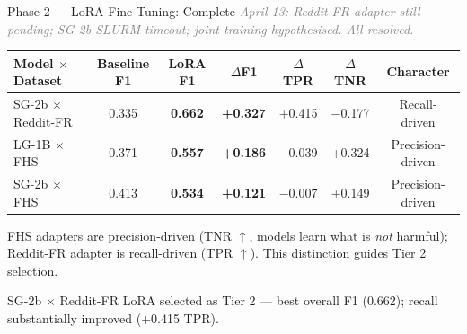 \documentclass[aspectratio=169, 12pt]{beamer}
\newcommand{\good}[1]{\textcolor{okgreen}{\textbf{#1}}}
\begin{document}
\begin{frame}[shrink=30]{Phase 2 --- LoRA Fine-Tuning: Complete}
  \textit{\small\textcolor{gray}{April 13: Reddit-FR adapter still pending; SG-2b SLURM timeout; joint training
  hypothesised. All resolved.}}\\[4pt]

  \scriptsize
  \begin{tabular}{lcccccc}
    \toprule
    \textbf{Model $\times$ Dataset} & \textbf{Baseline F1} & \textbf{LoRA F1} &
    \textbf{$\Delta$F1} & \textbf{$\Delta$TPR} & \textbf{$\Delta$TNR} & \textbf{Character} \\
    \midrule
    SG-2b $\times$ Reddit-FR & 0.335 & \good{0.662} & \good{+0.327} & +0.415 & $-$0.177 & Recall-driven \\
    LG-1B $\times$ FHS        & 0.371 & \good{0.557} & \good{+0.186} & $-$0.039 & +0.324  & Precision-driven \\
    SG-2b $\times$ FHS        & 0.413 & \good{0.534} & \good{+0.121} & $-$0.007 & +0.149  & Precision-driven \\
    \bottomrule
  \end{tabular}

  \vspace{4pt}
  \small
  FHS adapters are precision-driven (TNR $\uparrow$, models learn what is \emph{not} harmful);
  Reddit-FR adapter is recall-driven (TPR $\uparrow$).
  This distinction guides Tier 2 selection.

  \vspace{4pt}
  \begin{block}{}
    SG-2b $\times$ Reddit-FR LoRA selected as Tier 2 --- best overall F1 (0.662);
    recall substantially improved (+0.415 TPR).
  \end{block}
\end{frame}
\end{document}
